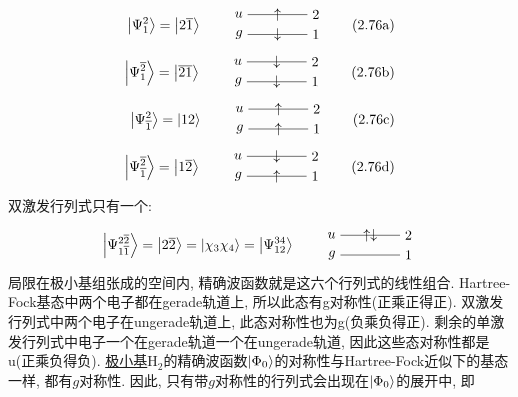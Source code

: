 \begin{align*}
\ket{\Psi_1^2}=\ket{2\bar{1}}\qquad
\begin{tikzpicture}[baseline={([yshift=-.8ex]current bounding box.center)}]
\draw (0,0)node[left] {$u$}--node[pos=0.5]{$\uparrow$}(1.5,0)node[right]{2};
\draw (0,-0.5)node[left] {$g$}--node[pos=0.5]{$\downarrow$}(1.5,-0.5)node[right]{1};
\end{tikzpicture}\tag*{(2.76a)}
\\
\ket{\Psi_1^{\bar{2}}}=\ket{\bar{21}}\qquad
\begin{tikzpicture}[baseline={([yshift=-.8ex]current bounding box.center)}]
\draw (0,0)node[left] {$u$}--node[pos=0.5]{$\downarrow$}(1.5,0)node[right]{2};
\draw (0,-0.5)node[left] {$g$}--node[pos=0.5]{$\downarrow$}(1.5,-0.5)node[right]{1};
\end{tikzpicture}\tag*{(2.76b)}
\\
\ket{\Psi_{\bar{1}}^2}=\ket{{12}}\qquad
\begin{tikzpicture}[baseline={([yshift=-.8ex]current bounding box.center)}]
\draw (0,0)node[left] {$u$}--node[pos=0.5]{$\uparrow$}(1.5,0)node[right]{2};
\draw (0,-0.5)node[left] {$g$}--node[pos=0.5]{$\uparrow$}(1.5,-0.5)node[right]{1};
\end{tikzpicture}\tag*{(2.76c)}
\\
\ket{\Psi_{\bar{1}}^{\bar{2}}}=\ket{1\bar{2}}\qquad
\begin{tikzpicture}[baseline={([yshift=-.8ex]current bounding box.center)}]
\draw (0,0)node[left] {$u$}--node[pos=0.5]{$\downarrow$}(1.5,0)node[right]{2};
\draw (0,-0.5)node[left] {${g}$}--node[pos=0.5]{$\uparrow$}(1.5,-0.5)node[right]{1};
\end{tikzpicture}\tag*{(2.76d)}
\addtocounter{equation}{1}
\end{align*}
双激发行列式只有一个:
\begin{equation}
\ket{\Psi_{1\bar{1}}^{2\bar{2}}}=\ket{2\bar{2}}=\ket{\chi_3\chi_4}=\ket{\Psi_{12}^{34}}\qquad
\begin{tikzpicture}[baseline={([yshift=-.8ex]current bounding box.center)}]
\draw (0,0)node[left] {$u$}--node[pos=0.5]{$\uparrow\downarrow$}(1.5,0)node[right]{2};
\draw (0,-0.5)node[left] {$g$}--(1.5,-0.5)node[right]{1};
\end{tikzpicture}
\end{equation}
局限在极小基组张成的空间内, 精确波函数就是这六个行列式的线性组合. Hartree-Fock基态中两个电子都在gerade轨道上, 所以此态有g对称性(正乘正得正). 双激发行列式中两个电子在ungerade轨道上, 此态对称性也为g(负乘负得正). 剩余的单激发行列式中电子一个在gerade轨道一个在ungerade轨道, 因此这些态对称性都是u(正乘负得负). \underline{极小基$\mathrm{H}_2$}的精确波函数$\Ket{\Phi_0}$的对称性与Hartree-Fock近似下的基态一样, 都有$g$对称性. 因此, 只有带$g$对称性的行列式会出现在$\Ket{\Phi_0}$的展开中, 即
